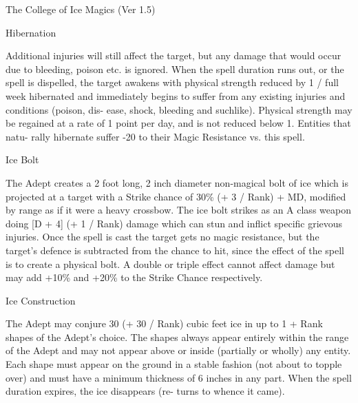 \begin{Chapter}{The College of Ice Magics (Ver 1.5)}
\begin{spell}[S-6]{Hibernation }
\begin{effects}
Additional  injuries  will  still  affect  the  target,  but 
any  damage  that  would  occur  due  to  bleeding, 
poison etc. is ignored. When the spell duration runs 
out,  or  the  spell  is  dispelled,  the  target  awakens 
with  physical  strength  reduced  by  1  /  full  week 
hibernated  and  immediately  begins  to  suffer  from 
any  existing  injuries  and  conditions  (poison,  dis-
ease,  shock,  bleeding  and  suchlike).  Physical 
strength  may  be  regained  at  a  rate  of  1  point  per 
day, and is not reduced below 1. Entities that natu-
rally hibernate suffer -20 to their Magic Resistance 
vs. this spell. 

\end{effects}
\end{spell}

\begin{spell}[S-7]{Ice Bolt }

\begin{effects}
 The  Adept  creates  a  2  foot  long,  2  inch 
diameter non-magical bolt of ice which is projected 
at a target with a Strike chance of 30\% (+ 3 / Rank) 
+  MD,  modified  by  range  as  if  it  were  a  heavy 
crossbow.  The  ice  bolt  strikes  as  an  A  class 
weapon doing [D + 4] (+ 1 / Rank) damage which 
can stun and inflict specific grievous injuries. Once 
the spell is cast the target gets no magic resistance, 
but  the  target’s  defence  is  subtracted  from  the 
chance  to  hit,  since  the  effect  of  the  spell  is  to 
create  a  physical  bolt.  A  double  or  triple  effect 
cannot  affect  damage  but  may  add  +10\%  and 
+20\% to the Strike Chance respectively. 

\end{effects}
\end{spell}

\begin{spell}[S-8]{Ice Construction }

\begin{effects}
 The  Adept  may  conjure  30  (+  30  /  Rank) 
cubic  feet  ice  in  up  to  1  +  Rank  shapes  of  the 
Adept’s choice. The shapes always appear entirely 
within  the  range  of  the  Adept  and  may  not  appear 
above  or  inside  (partially  or  wholly)  any  entity. 
Each  shape  must  appear  on  the  ground  in  a  stable 
fashion (not about to topple over) and must have a 
minimum thickness of  6  inches  in  any  part. When 
the  spell  duration  expires,  the  ice  disappears  (re-
turns to whence it came). 


\end{effects}
\end{spell}
\end{Chapter}
